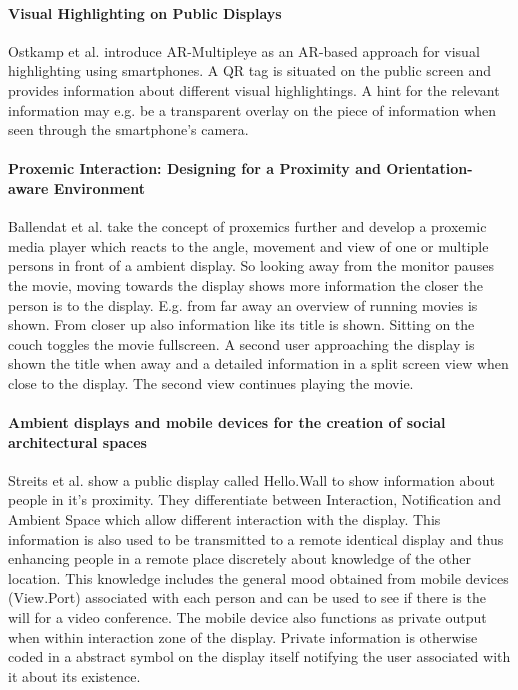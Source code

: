 \paragraph{Visual Highlighting on Public Displays}
Ostkamp et al. \cite{Ostkamp_VisualHighlighting} introduce AR-Multipleye as an AR-based approach for visual highlighting using smartphones. A QR tag is situated on the public screen and provides information about different visual highlightings. A hint for the relevant information may e.g. be a transparent overlay on the piece of information when seen through the smartphone’s camera.

\paragraph{Proxemic Interaction: Designing for a Proximity and Orientation-aware Environment}
Ballendat et al. \cite{ballendat_proxemic_2010} take the concept of proxemics further and develop a proxemic media player which reacts to the angle, movement and view of one or multiple persons in front of a ambient display.
So looking away from the monitor pauses the movie, moving towards the display shows more information the closer the person is to the display.
E.g. from far away an overview of running movies is shown.
From closer up also information like its title is shown.
Sitting on the couch toggles the movie fullscreen.
A second user approaching the display is shown the title when away and a detailed information in a split screen view when close to the display.
The second view continues playing the movie.

\paragraph{Ambient displays and mobile devices for the creation of social architectural spaces}
Streits et al. \cite{streitz_ambient_2003} show a public display called Hello.Wall to show information about people in it's proximity.
They differentiate between Interaction, Notification and Ambient Space which allow different interaction with the display.
This information is also used to be transmitted to a remote identical display and thus enhancing people in a remote place discretely about knowledge of the other location.
This knowledge includes the general mood obtained from mobile devices (View.Port) associated with each person and can be used to see if there is the will for a video conference.
The mobile device also functions as private output when within interaction zone of the display.
Private information is otherwise coded in a abstract symbol on the display itself notifying the user associated with it about its existence.




